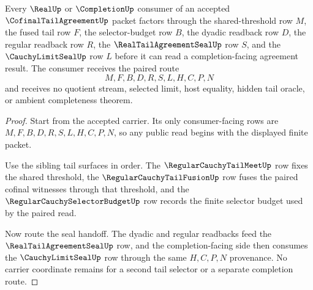 \begin{theorem}
\label{thm:cofinal-tail-agreement-consumer-factorization}
Every $\RealUp$ or $\CompletionUp$ consumer of an accepted $\CofinalTailAgreementUp$ packet factors through the shared-threshold row $M$, the fused tail row $F$, the selector-budget row $B$, the dyadic readback row $D$, the regular readback row $R$, the $\RealTailAgreementSealUp$ row $S$, and the $\CauchyLimitSealUp$ row $L$ before it can read a completion-facing agreement result. The consumer receives the paired route
$$
M,F,B,D,R,S,L,H,C,P,N
$$
and receives no quotient stream, selected limit, host equality, hidden tail oracle, or ambient completeness theorem.
\end{theorem}
\begin{proof}
Start from the accepted carrier. Its only consumer-facing rows are $M,F,B,D,R,S,L,H,C,P,N$, so any public read begins with the displayed finite packet.

Use the sibling tail surfaces in order. The $\RegularCauchyTailMeetUp$ row fixes the shared threshold, the $\RegularCauchyTailFusionUp$ row fuses the paired cofinal witnesses through that threshold, and the $\RegularCauchySelectorBudgetUp$ row records the finite selector budget used by the paired read.

Now route the seal handoff. The dyadic and regular readbacks feed the $\RealTailAgreementSealUp$ row, and the completion-facing side then consumes the $\CauchyLimitSealUp$ row through the same $H,C,P,N$ provenance. No carrier coordinate remains for a second tail selector or a separate completion route.
\end{proof}

